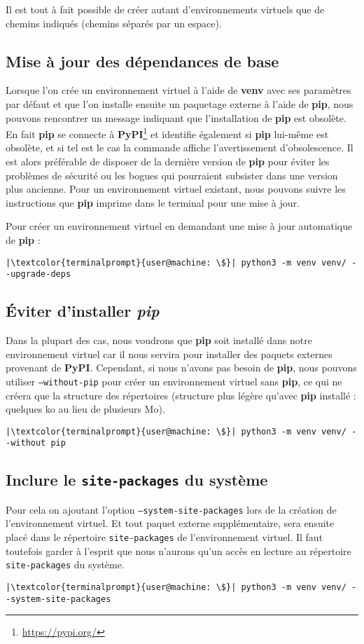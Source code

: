 Il est tout à fait possible de créer autant d'environnements virtuels que de chemins indiqués (chemins séparés par un espace).

\subsection*{Mise à jour des dépendances de base}
Lorsque l'on crée un environnement virtuel à l'aide de \textbf{venv} avec ses paramètres par défaut et que l'on installe ensuite un paquetage externe à l'aide de \textbf{pip}, nous pouvons rencontrer un message indiquant que l'installation de \textbf{pip} est obsolète. En fait \textbf{pip} se connecte à \textbf{PyPI}\footnote{\url{https://pypi.org/}} et identifie également si \textbf{pip} lui-même est obsolète, et si tel est le cas la commande affiche l'avertissement d'obsolescence.  Il est alors préférable de disposer de la dernière version de \textbf{pip} pour éviter les problèmes de sécurité ou les bogues qui pourraient subsister dans une version plus ancienne. Pour un environnement virtuel existant, nous pouvons suivre les instructions que \textbf{pip} imprime dans le terminal pour une mise à jour.

Pour créer un environnement virtuel en demandant une mise à jour automatique de \textbf{pip} :
\begin{lstlisting}[style=terminal]
|\textcolor{terminalprompt}{user@machine: \$}| python3 -m venv venv/ --upgrade-deps
\end{lstlisting}

\subsection*{Éviter d'installer \textit{pip}}
Dans la plupart des cas, nous voudrons que \textbf{pip} soit installé dans notre environnement virtuel car il nous servira pour installer des paquets externes provenant de \textbf{PyPI}. Cependant, si nous n'avons pas besoin de \textbf{pip}, nous pouvons utiliser \texttt{--without-pip} pour créer un environnement virtuel sans \textbf{pip}, ce qui ne créera que la structure des répertoires (structure plus légère qu'avec \textbf{pip} installé : quelques ko au lieu de plusieurs Mo).
\begin{lstlisting}[style=terminal]
|\textcolor{terminalprompt}{user@machine: \$}| python3 -m venv venv/ --without pip
\end{lstlisting}

\subsection*{Inclure le \texttt{site-packages} du système}
Pour cela on ajoutant l'option \texttt{--system-site-packages} lors de la création de l'environnement virtuel. Et tout paquet externe supplémentaire, sera ensuite placé dans le répertoire \texttt{site-packages} de l'environnement virtuel. Il faut toutefois garder à l'esprit que nous n'aurons qu'un accès en lecture au répertoire \texttt{site-packages} du système.
\begin{lstlisting}[style=terminal]
|\textcolor{terminalprompt}{user@machine: \$}| python3 -m venv venv/ --system-site-packages
\end{lstlisting}

